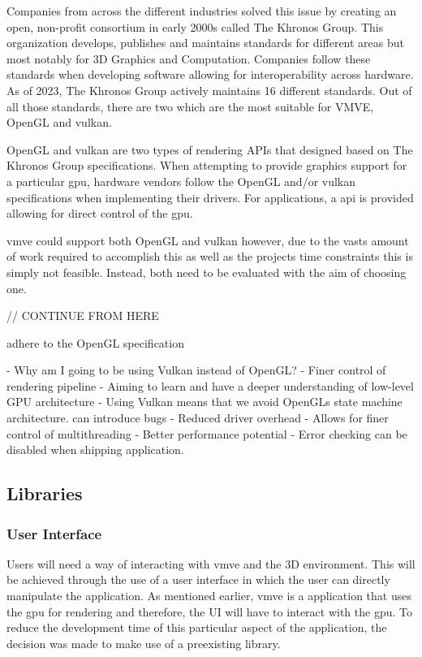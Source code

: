 \documentclass[11pt]{article}
\begin{document}
Companies from across the different industries solved this issue by creating
an open, non-profit consortium in early 2000s called The Khronos Group. This
organization develops, publishes and maintains standards for different areas
but most notably for 3D Graphics and Computation. Companies follow these 
standards when developing software allowing for interoperability across
hardware. As of 2023, The Khronos Group actively maintains 16 different
standards. Out of all those standards, there are two which are the most
suitable for VMVE, OpenGL and \gls{vulkan}.

OpenGL and \gls{vulkan} are two types of rendering APIs that designed based on
The Khronos Group specifications. When attempting to provide graphics support
for a particular \gls{gpu}, hardware vendors follow the OpenGL and/or \gls{vulkan}
specifications when implementing their drivers. For applications, a
\acrfull{api} is provided allowing for direct control of the \gls{gpu}.

\gls{vmve} could support both OpenGL and \gls{vulkan} however, due to the vasts
amount of work required to accomplish this as well as the projects time
constraints this is simply not feasible. Instead, both need to be evaluated with
the aim of choosing one.



// CONTINUE FROM HERE

adhere to the OpenGL specification

- Why am I going to be using Vulkan instead of OpenGL?
-   Finer control of rendering pipeline
-   Aiming to learn and have a deeper understanding of low-level GPU architecture
-   Using Vulkan means that we avoid OpenGLs state machine architecture.
    can introduce bugs
-   Reduced driver overhead
-   Allows for finer control of multithreading
-   Better performance potential
-   Error checking can be disabled when shipping application.



\subsection{Libraries}

\subsubsection{User Interface}
Users will need a way of interacting with \gls{vmve} and the 3D environment.
This will be achieved through the use of a user interface in which the user can
directly manipulate the application. As mentioned earlier, \gls{vmve} is a
application that uses the \gls{gpu} for rendering and therefore, the UI will
have to interact with the \gls{gpu}. To reduce the development time of this
particular aspect of the application, the decision was made to make use of a
preexisting library.
\end{document}
